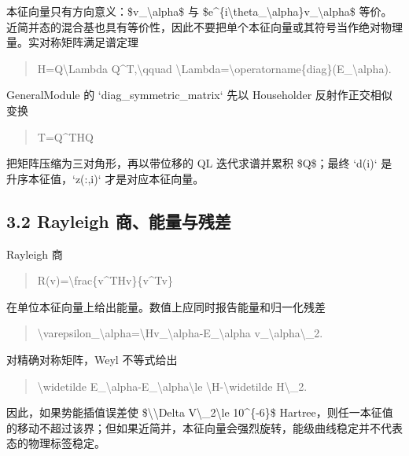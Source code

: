 \documentclass[UTF8,openany,11pt,fontset=fandol]{ctexbook}
\begin{document}
本征向量只有方向意义：\$v\_\textbackslash alpha\$ 与
\$e\^{}\{i\textbackslash theta\_\textbackslash alpha\}v\_\textbackslash alpha\$
等价。近简并态的混合基也具有等价性，因此不要把单个本征向量或其符号当作绝对物理量。实对称矩阵满足谱定理

\begin{quote}
H=Q\textbackslash Lambda Q\^{}T,\textbackslash qquad
\textbackslash Lambda=\textbackslash operatorname\{diag\}(E\_\textbackslash alpha).
\end{quote}

GeneralModule 的 `diag\_symmetric\_matrix` 先以 Householder
反射作正交相似变换

\begin{quote}
T=Q\^{}THQ
\end{quote}

把矩阵压缩为三对角形，再以带位移的 QL 迭代求谱并累积 \$Q\$；最终 `d(i)`
是升序本征值，`z(:,i)` 才是对应本征向量。

\subsection{\texorpdfstring{\textbf{3.2 Rayleigh
商、能量与残差}}{3.2 Rayleigh 商、能量与残差}}\label{rayleigh-ux5546ux80fdux91cfux4e0eux6b8bux5dee}

Rayleigh 商

\begin{quote}
R(v)=\textbackslash frac\{v\^{}THv\}\{v\^{}Tv\}
\end{quote}

在单位本征向量上给出能量。数值上应同时报告能量和归一化残差

\begin{quote}
\textbackslash varepsilon\_\textbackslash alpha=\textbackslash\textbar Hv\_\textbackslash alpha-E\_\textbackslash alpha
v\_\textbackslash alpha\textbackslash\textbar\_2.
\end{quote}

对精确对称矩阵，Weyl 不等式给出

\begin{quote}
\textbar\textbackslash widetilde
E\_\textbackslash alpha-E\_\textbackslash alpha\textbar\textbackslash le
\textbackslash\textbar H-\textbackslash widetilde
H\textbackslash\textbar\_2.
\end{quote}

因此，如果势能插值误差使 \$\textbackslash\textbar\textbackslash Delta
V\textbackslash\textbar\_2\textbackslash le 10\^{}\{-6\}\$
Hartree，则任一本征值的移动不超过该界；但如果近简并，本征向量会强烈旋转，能级曲线稳定并不代表态的物理标签稳定。
\end{document}
